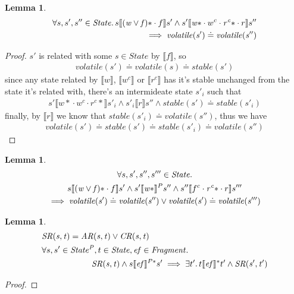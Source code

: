 \documentclass[a4paper,11pt]{article}
\newtheorem{lemma}[theorem]{Lemma}
\theoremstyle{definition}
\begin{document}
\begin{lemma}
\begin{align*}
	\forall s, s', s'' \in \mathit{State} \ldotp s \llbracket \mathit{(w \lor f)\ast} \cdot f \rrbracket s' \land s' \llbracket \mathit{w\ast} \cdot w^c \cdot \mathit{r^c\ast} \cdot r \rrbracket s'' \\
	  \implies \mathit{volatile(s')} \doteq \mathit{volatile(s'')}
\end{align*}
\end{lemma}
\begin{proof}
	$s'$ is related with some $s \in \mathit{State}$ by $\llbracket f \rrbracket$, so
	\begin{align*}
		\mathit{volatile(s')} \doteq \mathit{volatile(s)} \doteq \mathit{stable(s')}
	\end{align*}
	since any state related by $\llbracket w \rrbracket$, $\llbracket w^c \rrbracket$ or $\llbracket r^c \rrbracket$ has it's stable unchanged from the state it's related with, there's an intermideate state $s'_i$ such that 
	\begin{align*}
		s' \llbracket {w*} \cdot w^c \cdot {r^c *} \rrbracket s'_i \land s'_i \llbracket r \rrbracket s'' \land stable(s') \doteq stable(s'_i)
	\end{align*}
	finally, by $\llbracket r \rrbracket$ we know that $\mathit{stable(s'_i) \doteq volatile(s'')}$, thus we have
	\begin{align*}
		\mathit{volatile(s') \doteq stable(s') \doteq stable(s'_i) \doteq volatile(s'')}
	\end{align*}
\end{proof}

\begin{lemma}
\begin{multline}
      \forall s, s', s'', s''' \in \mathit{State} \ldotp \\ 
      s \llbracket \mathit{(w \lor f)\ast} \cdot f \rrbracket s' \land
      s' \llbracket \mathit{w\ast} \rrbracket^P s'' \land 
      s'' \llbracket f^c \cdot \mathit{r^c\ast} \cdot r \rrbracket s'''\\ \implies \mathit{volatile(s')} \doteq \mathit{volatile(s'')} \lor \mathit{volatile(s')} \doteq \mathit{volatile(s''')}
\end{multline}
\end{lemma}

\begin{lemma}
	\begin{align*}
		&\mathit{SR(s, t)} = \mathit{AR(s, t)} \lor \mathit{CR(s, t)}\\
		&\forall s, s' \in \mathit{State^P}, t \in \mathit{State}, \mathit{ef} \in \mathit{Fragment} \ldotp\\
		&\qquad \qquad \qquad \mathit{SR(s, t)} \land s \llbracket \mathit{ef} \rrbracket^{P*} s' \implies \exists t' \ldotp t\llbracket \mathit{ef} \rrbracket^* t' \land \mathit{SR(s', t')} \\
	\end{align*}
\end{lemma}
\begin{proof}
\end{proof}
\end{document}
